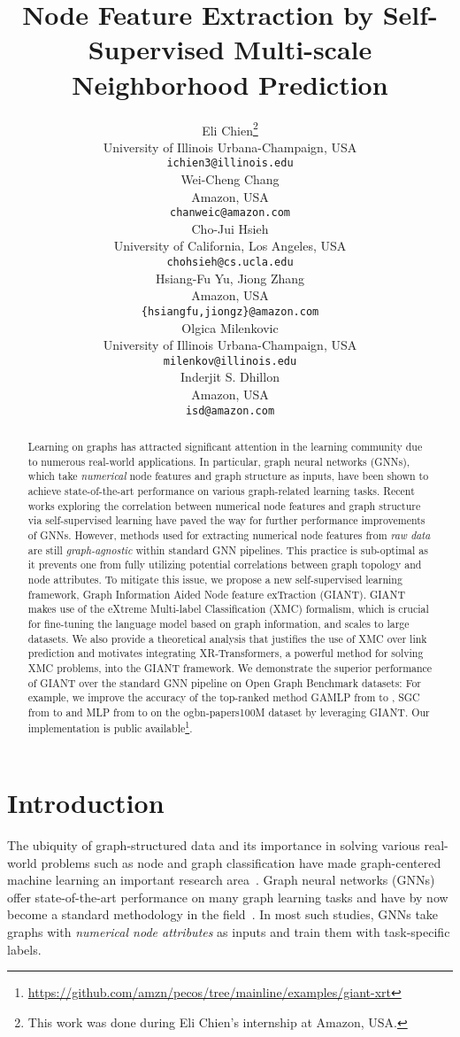 \documentclass{article} \usepackage{iclr2022_conference,times}
\title{Node Feature Extraction by Self-Supervised Multi-scale Neighborhood Prediction}
\author{Eli Chien\thanks{This work was done during Eli Chien’s internship at Amazon, USA.} \\
University of Illinois Urbana-Champaign, USA\\
\texttt{ichien3@illinois.edu} \\
\And
Wei-Cheng Chang \\
Amazon, USA \\
\texttt{chanweic@amazon.com} \\
\AND
Cho-Jui Hsieh \\
University of California, Los Angeles, USA\\
\texttt{chohsieh@cs.ucla.edu} \\
\And
Hsiang-Fu Yu,  Jiong Zhang \\
Amazon, USA \\
\texttt{\{hsiangfu,jiongz\}@amazon.com} \\
\AND
Olgica Milenkovic\\
University of Illinois Urbana-Champaign, USA\\
\texttt{milenkov@illinois.edu}\\
\And
Inderjit S. Dhillon\\
Amazon, USA \\
\texttt{isd@amazon.com} \\
}
\begin{document}
\maketitle

\begin{abstract}
Learning on graphs has attracted significant attention in the learning community due to numerous real-world applications. In particular, graph neural networks (GNNs), which take \emph{numerical} node features and graph structure as inputs, have been shown to achieve state-of-the-art performance on various graph-related learning tasks. Recent works exploring the correlation between numerical node features and graph structure via self-supervised learning have paved the way for further performance improvements of GNNs. However, methods used for extracting numerical node features from \emph{raw data} are still \emph{graph-agnostic} within standard GNN pipelines. This practice is sub-optimal as it prevents one from fully utilizing potential correlations between graph topology and node attributes. To mitigate this issue, we propose a new self-supervised learning framework, Graph Information Aided Node feature exTraction (GIANT). GIANT makes use of the eXtreme Multi-label Classification (XMC) formalism, which is crucial for fine-tuning the language model based on graph information, and scales to large datasets. We also provide a theoretical analysis that justifies the use of XMC over link prediction and motivates integrating XR-Transformers, a powerful method for solving XMC problems, into the GIANT framework. We demonstrate the superior performance of GIANT over the standard GNN pipeline on Open Graph Benchmark datasets: For example, we improve the accuracy of the top-ranked method GAMLP from  to , SGC from  to  and MLP from  to  on the ogbn-papers100M dataset by leveraging GIANT. Our implementation is public available\footnote{\url{https://github.com/amzn/pecos/tree/mainline/examples/giant-xrt}}. 
\end{abstract}

\vspace{-0.5cm}
\section{Introduction}
The ubiquity of graph-structured data and its importance in solving various real-world problems such as node and graph classification have made graph-centered machine learning an important research area~\citep{lu2011link,shervashidze2011weisfeiler,zhu2005semi}. Graph neural networks (GNNs) offer state-of-the-art performance on many graph learning tasks and have by now become a standard methodology in the field~\citep{kipf2017semi,hamilton2017inductive,velickovic2018graph,chien2020adaptive}. In most such studies, GNNs take graphs with \emph{numerical node attributes} as inputs and train them with task-specific labels. 
\end{document}
